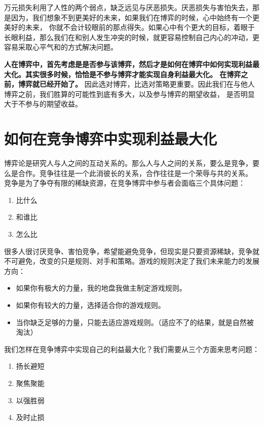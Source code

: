 \documentclass[12pt, a4paper]{article} %
\begin{document}
\begin{CJK*}{UTF8}{gbsn}
        万元损失利用了人性的两个弱点，缺乏远见与厌恶损失。厌恶损失与害怕失去，那是因为，我们想象不到更美好的未来，如果我们在博弈的时候，心中始终有一个更美好的未来，
        你就不会计较眼前的那点得失。如果心中有个更大的目标，着眼于长眼利益，那么我们在和别人发生冲突的时候，就更容易控制自己内心的冲动，更容易采取心平气和的方式解决问题。\par

        \textbf{人在博弈中，首先考虑是是否参与该博弈，然后才是如何在博弈中如何实现利益最大化。其实很多时候，恰恰是不参与博弈才能实现自身利益最大化。
        在博弈之前，博弈就已经开始了。} 因此选对博弈，比选对策略更重要。因此我们在与他人博弈之前，我们胜算的可能性到底有多大，以及参与博弈的期望收益，
        是否明显大于不参与的期望收益。

        \clearpage
        \section{如何在竞争博弈中实现利益最大化}
        博弈论是研究人与人之间的互动关系的。那么人与人之间的关系，要么是竞争，要么是合作。竞争往往是一个此消彼长的关系，合作往往是一个荣辱与共的关系。
        竞争是为了争夺有限的稀缺资源，在竞争博弈中参与者会面临三个具体问题：

        \begin{enumerate}
            \item 比什么
            \item 和谁比
            \item 怎么比
        \end{enumerate}

        很多人很讨厌竞争、害怕竞争，希望能避免竞争，但现实是只要资源稀缺，竞争就不可避免，改变的只是规则、对手和策略。游戏的规则决定了我们未来能力的发展
        方向：
        \begin{itemize}
            \item 如果你有极大的力量，我的地盘我做主制定游戏规则。
            \item 如果你有较大的力量，选择适合你的游戏规则。
            \item 当你缺乏足够的力量，只能去适应游戏规则。（适应不了的结果，就是自然被淘汰）
        \end{itemize}

        我们怎样在竞争博弈中实现自己的利益最大化？我们需要从三个方面来思考问题：

        \begin{enumerate}
            \item 扬长避短
            \item 聚焦聚能
            \item 以强胜弱
            \item 及时止损
        \end{enumerate}


\end{CJK*}
\end{document}
